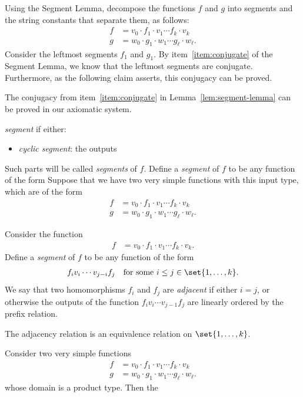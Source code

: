 Using the Segment Lemma, decompose the functions $f$ and $g$ into segments and the string constants that separate them, as follows:
    \begin{align*}
f & = v_0  \cdot f_1 \cdot  v_1 \cdots f_k \cdot v_k \\
g &= w_0 \cdot g_1 \cdot w_1 \cdots g_\ell \cdot w_\ell.
\end{align*}
Consider the leftmost segments $f_1$ and $g_1$.  By item~\ref{item:conjugate} of the Segment Lemma, we know that the leftmost segments are conjugate. Furthermore, as the following claim asserts, this conjugacy can be proved. 
 \begin{claim}
The conjugacy from item~\ref{item:conjugate} in Lemma~\ref{lem:segment-lemma} can be proved in our axiomatic system.    
 \end{claim}



\emph{segment} if either:
\begin{itemize}
    \item \emph{cyclic segment}: the outputs 
\end{itemize}
Such parts will be called \emph{segments} of $f$. 
Define a \emph{segment} of $f$ to be any function of the form 
Suppose that we have two very simple  functions with this input type, which are of the form 
\begin{align*}
f & = v_0  \cdot f_1 \cdot  v_1 \cdots f_k \cdot v_k \\
g &= w_0 \cdot g_1 \cdot w_1 \cdots g_\ell \cdot w_\ell.
\end{align*}


Consider the function 
\begin{align*}
f & = v_0  \cdot f_1 \cdot  v_1 \cdots f_k \cdot v_k.
\end{align*}
Define a \emph{segment} of $f$ to be any function of the form 
\begin{align*}
 f_i v_i \cdots v_{j-i} f_j \quad \text{for some $i \leq j \in \set{1,\ldots,k}$}.
\end{align*}
We say that two homomorphisms $f_i$ and $f_j$ are \emph{adjacent} if either $i = j$, or otherwise the outputs of the function $f_i v_i \cdots v_{j-1} f_j$ are linearly ordered by the prefix relation. 
\begin{lemma}
    The adjacency relation is an equivalence relation on $\set{1,\ldots,k}$.
\end{lemma}


\begin{lemma}
    Consider two very simple functions 
    \begin{align*}
f & = v_0  \cdot f_1 \cdot  v_1 \cdots f_k \cdot v_k \\
g &= w_0 \cdot g_1 \cdot w_1 \cdots g_\ell \cdot w_\ell.
\end{align*}
whose domain is a product type. Then the 
\end{lemma}

